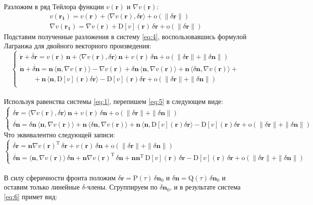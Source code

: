 \documentclass{article}
\newcommand{\bfv}[1]{\mathbf{#1}}
\newcommand{\dd}[1]{\dot{#1}}
\newcommand{\dv}[1]{\nabla v(#1)}
\newcommand{\ddv}[1]{\mathrm{D}[v](#1)}
\newcommand{\dr}{\delta \bfv{r}}
\newcommand{\dn}{\delta \bfv{n}}
\newcommand{\om}[1]{\mathrm{o}(#1)}
\newcommand{\dprod}[2]{\langle #1, #2 \rangle}
\newcommand{\T}[1]{#1^\mathrm{T}}
\newcommand{\matr}[1]{\mathrm{#1}}
\begin{document}
Разложим в ряд Тейлора функции $v(\bfv{r})$ и $\dv{\bfv{r}}$:
\begin{gather*} 
v(\bfv{r_1}) = v(\bfv{r}) + \dprod{\dv{\bfv{r}}}{\dr} + \om{\|\dr\|}\\ 
\dv{\bfv{r_1}} = \dv{\bfv{r}} + \ddv{\bfv{r}}\,\dr + \om{\|\dr\|}
\end{gather*}
Подставим полученные разложения в систему \eqref{eq:4}, воспользовавшись формулой Лагранжа для двойного векторного произведения: 
\begin{equation} \label{eq:5}
\begin{cases}
\dd{\bfv{r}} + \dd{\dr} = v(\bfv{r})\,\bfv{n} + \dprod{\dv{\bfv{r}}}{\dr}\,\bfv{n} + v(\bfv{r})\,\dn + \om{\|\dr\| + \|\dn\|}\\
\dd{\bfv{n}} + \dd{\dn} = \bfv{n}\,\dprod{\bfv{n}}{\dv{\bfv{r}}} - \dv{\bfv{r}} + \dn\,\dprod{\bfv{n}}{\dv{\bfv{r}}} + \bfv{n}\,\dprod{\dn}{\dv{\bfv{r}}} + \\ 
\qquad + \bfv{n}\,\dprod{\bfv{n}}{\ddv{\bfv{r}}\dr} - \ddv{\bfv{r}}\dr + \om{\|\dr\| + \|\dn\|}\\
\end{cases}
\end{equation}\\
Используя равенства системы \eqref{eq:1}, перепишем \eqref{eq:5} в следующем виде:
\begin{equation*}
\begin{cases}
\dd{\dr} = \dprod{\dv{\bfv{r}}}{\dr}\,\bfv{n} + v(\bfv{r})\,\dn + \om{\|\dr\| + \|\dn\|}\\
\dd{\dn} = \dn\,\dprod{\bfv{n}}{\dv{\bfv{r}}} + \bfv{n}\,\dprod{\dn}{\dv{\bfv{r}}} + \bfv{n}\,\dprod{\bfv{n}}{\ddv{\bfv{r}}\dr} - \ddv{\bfv{r}}\dr + \om{\|\dr\| + \|\dn\|}
\end{cases}
\end{equation*}
Что эквивалентно следующей записи:
\begin{equation} \label{eq:6}
\begin{cases}
\dd{\dr} = \bfv{n}\T{\dv{\bfv{r}}}\,\dr + v(\bfv{r})\,\dn + \om{\|\dr\| + \|\dn\|}\\
\dd{\dn} = \dprod{\bfv{n}}{\dv{\bfv{r}}}\,\dn + \bfv{n}\T{\dv{\bfv{r}}}\,\dn + \bfv{n}\T{\bfv{n}}\,\ddv{\bfv{r}}\,\dr - \ddv{\bfv{r}}\,\dr + \om{\|\dr\| + \|\dn\|}
\end{cases}
\end{equation}\\
В силу сферичности фронта положим $\dr = \matr{P}(\tau)\,\dn_0$ и $\dn = \matr{Q}(\tau)\,\dn_0$ и оставим только линейные $\delta$-члены. Сгруппируем по $\dn_0$, и в результате система \eqref{eq:6} примет вид:
\end{document}
